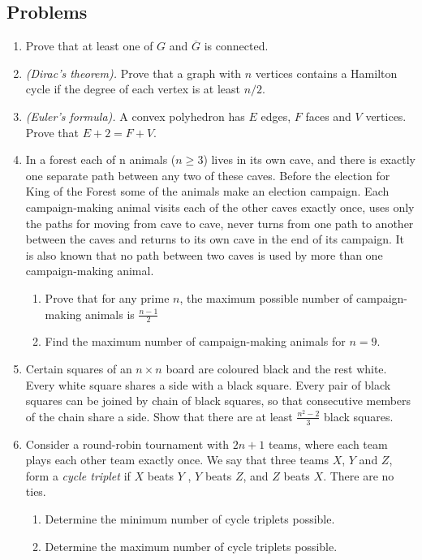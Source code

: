 \documentclass{article}
\begin{document}
\subsection*{Problems}
\begin{enumerate}
	\item
	Prove that at least one of $G$ and $\overline{G}$ is connected.
	
	\item 
	\emph{(Dirac's theorem).} Prove that a graph with $n$ vertices contains a Hamilton cycle if the degree of each vertex is at least $n/2$. 	
	
	\item 
	\emph{(Euler's formula).}  A convex polyhedron has $E$ edges, $F$ faces and $V$ vertices. Prove that $E+2=F+V$.

	\item %
	In a forest each of n animals ($n \geq 3$) lives in its own cave, and there is exactly one separate path
	between any two of these caves. Before the election for King of the Forest some of the animals
	make an election campaign. Each campaign-making animal visits each of the other caves exactly
	once, uses only the paths for moving from cave to cave, never turns from one path to another
	between the caves and returns to its own cave in the end of its campaign. It is also known that
	no path between two caves is used by more than one campaign-making animal.
	\begin{enumerate}
		\item Prove that for any prime $n$, the maximum possible number of campaign-making animals is $\tfrac{n-1}{2}$
		\item Find the maximum number of campaign-making animals for $n = 9$.	
	\end{enumerate}
	
	\item %
	Certain squares of an $n \times n$ board are coloured black and the rest white. Every white square shares a side with a black square. Every pair of black squares can be joined by chain of black squares, so that consecutive members of the chain share a side. Show that there are at least $\tfrac{n^2-2}{3}$ black squares.
	
	
	\item %
	Consider a round-robin tournament with $2n + 1$ teams, where each team plays each other team exactly once. We say
	that three teams $X$, $Y$ and $Z$, form a \emph{cycle triplet} if $X$ beats $Y$ , $Y$ beats $Z$, and $Z$ beats $X$. There are no ties.
	\begin{enumerate}
		\item Determine the minimum number of cycle triplets possible.
		\item Determine the maximum number of cycle triplets possible.
	\end{enumerate}
	 

\end{enumerate}
\end{document}
